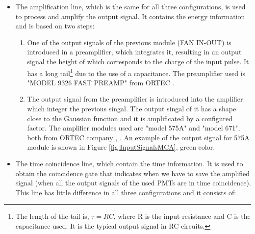 \begin{itemize}

\item{} The amplification line, which is the same for all three configurations, is used to process and amplify the output signal. It contains the energy information and is based on two steps:



\begin{enumerate}

\item{} One of the output signals of the previous module (FAN IN-OUT) is introduced in a preamplifier, which integrates it, resulting in an output signal the height of which corresponds to the charge of the input pulse. It has a long tail\footnote{The length of the tail is, $\tau=RC$, where R is the input resistance and C is the capacitance used. It is the typical output signal in RC circuits.} due to the use of a capacitance. The preamplifier used is "MODEL 9326 FAST PREAMP" from ORTEC \cite{DataSheetPreAmp}.

\item{} The output signal from the preamplifier is introduced into the amplifier which integer the previous singal. The output singal of it has a shape close to the Gaussian function and it is amplificated by a configured factor. The amplifier modules used are "model 575A" and "model 671", both from ORTEC company \cite{DataSheet575Amp}, \cite{DataSheet671Amp}. An example of the output signal for 575A module is shown in Figure \ref{fig:InputSignalsMCA}, green color.

\end{enumerate}

\item{} The time coincidence line, which  contain the time information. It is used to obtain the coincidence gate that indicates when we have to save the amplified signal (when all the output signals of the used PMTs are in time coincidence). This line has little difference in all three configurations and it consists of:

\begin{enumerate}


\end{enumerate}
\end{itemize}
